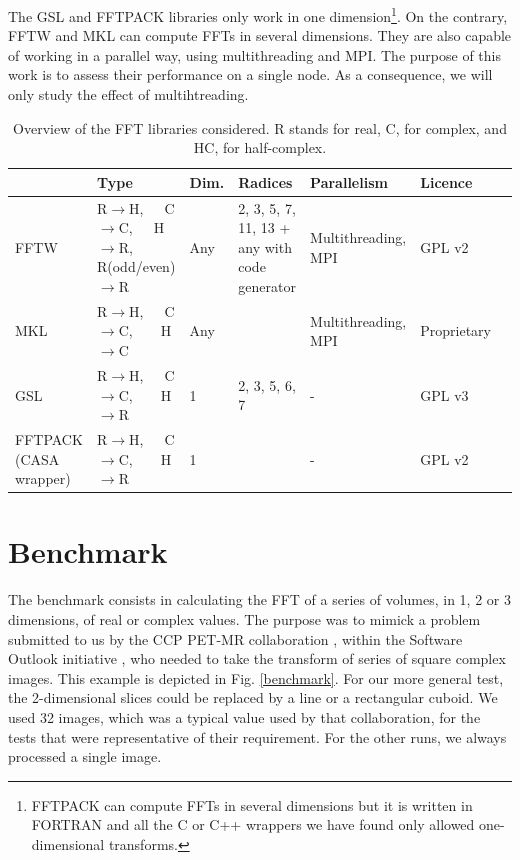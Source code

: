 \documentclass[12pt, a4paper]{article}
\begin{document}
The GSL and FFTPACK libraries only work in one dimension\footnote{FFTPACK can compute FFTs in several dimensions but it is written in FORTRAN and all the C or C++ wrappers we have found only allowed one-dimensional transforms.}. On the contrary, FFTW and MKL can compute FFTs in several dimensions. They are also capable of working in a parallel way, using multithreading and MPI. The purpose of this work is to assess their performance on a single node. As a consequence, we will only study the effect of multihtreading. 
\begin{table}[H]
\captionsetup{width=1\textwidth}
\begin{tabular}{|p{2.5cm}||p{2.5cm}|p{1cm}|p{3cm}|p{3cm}|p{2cm}|p{2cm}|}
\hline
& Type & Dim. & Radices & Parallelism & Licence \\
\hline
\hline
FFTW & R$\to$H,\ \ \  C$\to$C,\ \ \  H$\to$R, R{\scriptsize (odd/even)}$\to$R& Any&2, 3, 5, 7, 11, 13 + any with code generator & Multithreading, MPI & GPL v2\\
\hline
MKL  &  R$\to$H,\ \ \  C$\to$C,\ \ \ \  H$\to$C& Any & & Multithreading, MPI & Proprietary\\
\hline
GSL  &  R$\to$H,\ \ \  C$\to$C,\ \ \ \  H$\to$R & 1 & 2, 3, 5, 6, 7 & - & GPL v3\\
\hline
FFTPACK {\scriptsize (CASA wrapper)} &  R$\to$H,\ \ \  C$\to$C,\ \ \ \  H$\to$R & 1 & & - & GPL v2\\
\hline
\end{tabular}
\caption{Overview of the FFT libraries considered. R stands for real, C, for complex, and HC, for half-complex.}
\label{ffttable}
\end{table}
\section{Benchmark}
The benchmark \cite{code} consists in calculating the FFT of a series of volumes, in 1, 2 or 3 dimensions, of real or complex values. The purpose was to mimick a problem submitted to us by the CCP PET-MR collaboration \cite{ccppetmr}, within the Software Outlook initiative \cite{softwareoutlook}, who needed to take the transform of series of square complex images. This example is depicted in Fig. \ref{benchmark}. For our more general test, the 2-dimensional slices could be replaced by a line or a rectangular cuboid. We used 32 images, which was a typical value used by that collaboration, for the tests that were representative of their requirement. For the other runs, we always processed a single image.\\
\end{document}
